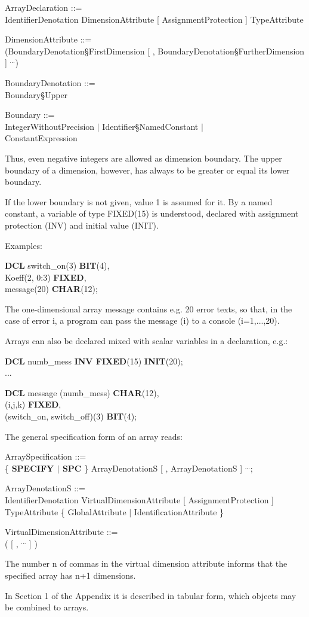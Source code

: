 \begin{tobedone}
ArrayDeclaration ::=\\
\x IdentifierDenotation DimensionAttribute [ AssignmentProtection ] TypeAttribute\\
\x [ GlobalAttribute ] [ InitialisationAttribute ]

DimensionAttribute ::=\\
\x (BoundaryDenotation\S FirstDimension [ , BoundaryDenotation\S FurtherDimension ] $^{...}$)

BoundaryDenotation ::=\\
 Boundary\S Upper

Boundary ::=\\
\x [ - ] IntegerWithoutPrecision $\mid$ Identifier\S NamedConstant $\mid$ \\
\x ConstantExpression

Thus, even negative integers are allowed as dimension boundary. The
upper boundary of a dimension, however, has always to be greater or
equal its lower boundary.

If the lower boundary is not given, value 1 is assumed for it. By a
named constant, a variable of type FIXED(15) is understood, declared
with assignment protection (INV) and initial value (INIT).

Examples:

{\bf DCL} switch\_on(3) {\bf BIT}(4),\\
\x Koeff(2, 0:3) {\bf FIXED},\\
\x message(20) {\bf CHAR}(12);

The one-dimensional array message contains e.g. 20 error texts, so that,
in the case of error i, a program can pass the message (i) to a console
(i=1,...,20).

Arrays can also be declared mixed with scalar variables in a declaration,
e.g.:

{\bf DCL} numb\_mess {\bf INV FIXED}(15) {\bf INIT}(20);\\
\x ...

{\bf DCL}  message (numb\_mess) {\bf CHAR}(12),\\
\x (i,j,k) {\bf FIXED},\\
\x (switch\_on, switch\_off)(3) {\bf BIT}(4);

The general specification form of an array reads:

ArraySpecification ::=\\
\x \{ {\bf SPECIFY $\mid$ SPC} \} ArrayDenotationS [ , ArrayDenotationS ] $^{...}$;

ArrayDenotationS ::=\\
\x IdentifierDenotation VirtualDimensionAttribute [ AssignmentProtection ] \\
\x TypeAttribute \{ GlobalAttribute $\mid$ IdentificationAttribute \}

VirtualDimensionAttribute ::=\\
\x ( [ , $^{...}$ ] )

The number n of commas in the virtual dimension attribute informs that
the specified array has n+1 dimensions.

In Section 1 of the Appendix it is described in tabular form, which
objects may be combined to arrays.
\end{tobedone}


